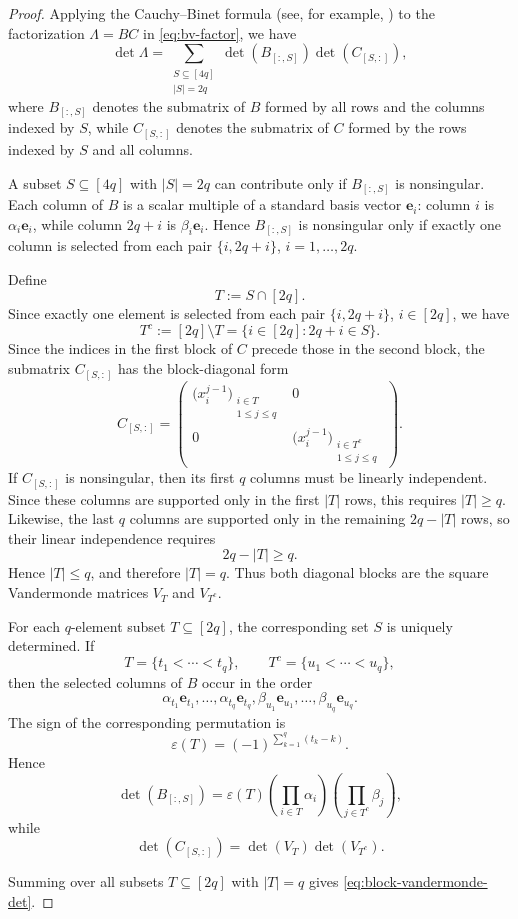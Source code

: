 \documentclass[11pt,a4paper]{article}
\theoremstyle{definition}
\begin{document}
\begin{proof}
Applying the Cauchy--Binet formula (see, for example, \cite{Gantmacher1959}) to the factorization
\(\Lambda=BC\) in \eqref{eq:bv-factor}, we have
\[
\det\Lambda
=
\sum_{\substack{S\subseteq[4q]\\ |S|=2q}}
\det(B_{[:,S]})\det(C_{[S,:]}),
\]
where \(B_{[:,S]}\) denotes the submatrix of \(B\) formed by all rows
and the columns indexed by \(S\), while \(C_{[S,:]}\) denotes the
submatrix of \(C\) formed by the rows indexed by \(S\) and all columns.

A subset $S\subseteq[4q]$ with $|S|=2q$ can contribute only if
$B_{[:,S]}$ is nonsingular. Each column of \(B\) is a scalar multiple
of a standard basis vector \(\mathbf e_i\): column \(i\) is
\(\alpha_i\mathbf e_i\), while column \(2q+i\) is
\(\beta_i\mathbf e_i\). Hence \(B_{[:,S]}\) is nonsingular only if
exactly one column is selected from each pair
\(\{i,2q+i\}\), \(i=1,\dots,2q\).

Define
\[
T:=S\cap[2q].
\]
Since exactly one element is selected from each pair
\(\{i,2q+i\}\), \(i\in[2q]\), we have
\[
T^c:=[2q]\setminus T
=
\{i\in[2q]:2q+i\in S\}.
\]
Since the indices in the first block of \(C\) precede those in the
second block, the submatrix \(C_{[S,:]}\) has the block-diagonal form
\[
C_{[S,:]}
=
\begin{pmatrix}
\bigl(x_i^{j-1}\bigr)_{\substack{i\in T\\1\leq j\leq q}} & 0\\
0 &
\bigl(x_i^{j-1}\bigr)_{\substack{i\in T^c\\1\leq j\leq q}}
\end{pmatrix}.
\]
If $C_{[S,:]}$ is nonsingular, then its first $q$ columns must be
linearly independent. Since these columns are supported only in the
first $|T|$ rows, this requires $|T|\ge q$. Likewise, the last $q$
columns are supported only in the remaining $2q-|T|$ rows, so their
linear independence requires
\[
2q-|T|\ge q.
\]
Hence $|T|\le q$, and therefore $|T|=q$. Thus both diagonal blocks are the square Vandermonde matrices
\(V_T\) and \(V_{T^c}\).

For each \(q\)-element subset \(T\subseteq[2q]\), the corresponding
set \(S\) is uniquely determined. If
\[
T=\{t_1<\cdots<t_q\},
\qquad
T^c=\{u_1<\cdots<u_q\},
\]
then the selected columns of \(B\) occur in the order
\[
\alpha_{t_1}\mathbf e_{t_1},\dots,
\alpha_{t_q}\mathbf e_{t_q},
\beta_{u_1}\mathbf e_{u_1},\dots,
\beta_{u_q}\mathbf e_{u_q}.
\]
The sign of the corresponding permutation is
\[
\varepsilon(T)
=
(-1)^{\sum_{k=1}^q(t_k-k)}.
\]
Hence
\[
\det(B_{[:,S]})
=
\varepsilon(T)
\left(\prod_{i\in T}\alpha_i\right)
\left(\prod_{j\in T^c}\beta_j\right),
\]
while
\[
\det(C_{[S,:]})
=
\det(V_T)\det(V_{T^c}).
\]

Summing over all subsets \(T\subseteq[2q]\) with \(|T|=q\) gives
\eqref{eq:block-vandermonde-det}.
\end{proof}
\end{document}
